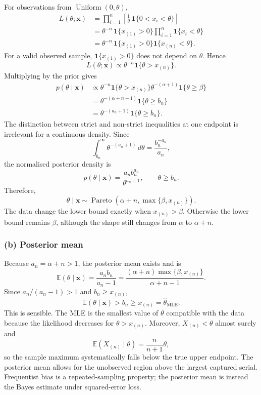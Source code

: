 \documentclass[11pt,a4paper]{article}
\newcommand{\xvec}{\boldsymbol{x}}
\newcommand{\E}{\mathbb{E}}
\begin{document}
For observations from $\operatorname{Uniform}(0,\theta)$,
\begin{align*}
L(\theta;\xvec)
&=\prod_{i=1}^n
  \left[\frac{1}{\theta}\,
  \mathbf{1}\{0<x_i<\theta\}\right]\\
&=\theta^{-n}\,
  \mathbf{1}\{x_{(1)}>0\}
  \prod_{i=1}^n\mathbf{1}\{x_i<\theta\}\\
&=\theta^{-n}\,
  \mathbf{1}\{x_{(1)}>0\}
  \mathbf{1}\{x_{(n)}<\theta\}.
\end{align*}
For a valid observed sample, $\mathbf{1}\{x_{(1)}>0\}$ does not depend on
$\theta$. Hence
\[
L(\theta;\xvec)
\propto\theta^{-n}\mathbf{1}\{\theta>x_{(n)}\}.
\]
Multiplying by the prior gives
\begin{align*}
p(\theta\mid\xvec)
&\propto
\theta^{-n}\mathbf{1}\{\theta>x_{(n)}\}
\theta^{-(\alpha+1)}\mathbf{1}\{\theta\geq\beta\}\\
&=\theta^{-(\alpha+n+1)}
  \mathbf{1}\{\theta\geq b_n\}\\
&=\theta^{-(a_n+1)}\mathbf{1}\{\theta\geq b_n\}.
\end{align*}
The distinction between strict and non-strict inequalities at one endpoint
is irrelevant for a continuous density. Since
\[
\int_{b_n}^{\infty}\theta^{-(a_n+1)}\,d\theta
=\frac{b_n^{-a_n}}{a_n},
\]
the normalised posterior density is
\[
p(\theta\mid\xvec)
=\frac{a_n b_n^{a_n}}{\theta^{a_n+1}},
\qquad \theta\geq b_n.
\]
Therefore,
\[
\boxed{
\theta\mid\xvec
\sim\operatorname{Pareto}\!\left(
\alpha+n,\max\{\beta,x_{(n)}\}
\right).
}
\]
The data change the lower bound exactly when $x_{(n)}>\beta$. Otherwise the
lower bound remains $\beta$, although the shape still changes from $\alpha$
to $\alpha+n$.

\subsubsection*{(b) Posterior mean}

Because $a_n=\alpha+n>1$, the posterior mean exists and is
\[
\boxed{
\E(\theta\mid\xvec)
=\frac{a_n b_n}{a_n-1}
=\frac{(\alpha+n)\max\{\beta,x_{(n)}\}}
{\alpha+n-1}.
}
\]
Since $a_n/(a_n-1)>1$ and $b_n\geq x_{(n)}$,
\[
\E(\theta\mid\xvec)>b_n\geq x_{(n)}
=\widehat{\theta}_{\mathrm{MLE}}.
\]
This is sensible. The MLE is the smallest value of $\theta$ compatible with
the data because the likelihood decreases for $\theta>x_{(n)}$. Moreover,
$X_{(n)}<\theta$ almost surely and
\[
\E(X_{(n)}\mid\theta)=\frac{n}{n+1}\theta,
\]
so the sample maximum systematically falls below the true upper endpoint.
The posterior mean allows for the unobserved region above the largest captured
serial. Frequentist bias is a repeated-sampling property; the posterior mean
is instead the Bayes estimate under squared-error loss.
\end{document}
